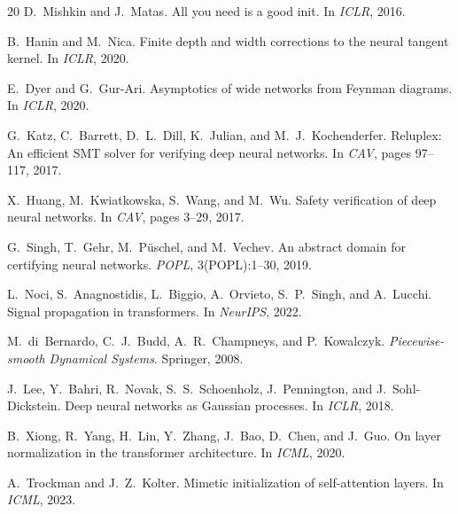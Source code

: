 \documentclass[10pt]{article}
\begin{document}
\begin{thebibliography}{20}
D.~Mishkin and J.~Matas.
\newblock All you need is a good init.
\newblock In \emph{ICLR}, 2016.

B.~Hanin and M.~Nica.
\newblock Finite depth and width corrections to the neural tangent kernel.
\newblock In \emph{ICLR}, 2020.

E.~Dyer and G.~Gur-Ari.
\newblock Asymptotics of wide networks from {F}eynman diagrams.
\newblock In \emph{ICLR}, 2020.

G.~Katz, C.~Barrett, D.~L.~Dill, K.~Julian, and M.~J.~Kochenderfer.
\newblock Reluplex: An efficient {SMT} solver for verifying deep neural networks.
\newblock In \emph{CAV}, pages 97--117, 2017.

X.~Huang, M.~Kwiatkowska, S.~Wang, and M.~Wu.
\newblock Safety verification of deep neural networks.
\newblock In \emph{CAV}, pages 3--29, 2017.

G.~Singh, T.~Gehr, M.~P{\"u}schel, and M.~Vechev.
\newblock An abstract domain for certifying neural networks.
\newblock \emph{POPL}, 3(POPL):1--30, 2019.

L.~Noci, S.~Anagnostidis, L.~Biggio, A.~Orvieto, S.~P.~Singh, and A.~Lucchi.
\newblock Signal propagation in transformers.
\newblock In \emph{NeurIPS}, 2022.

M.~di~Bernardo, C.~J.~Budd, A.~R.~Champneys, and P.~Kowalczyk.
\newblock \emph{Piecewise-smooth Dynamical Systems}.
\newblock Springer, 2008.

J.~Lee, Y.~Bahri, R.~Novak, S.~S.~Schoenholz, J.~Pennington, and J.~Sohl-Dickstein.
\newblock Deep neural networks as {G}aussian processes.
\newblock In \emph{ICLR}, 2018.

B.~Xiong, R.~Yang, H.~Lin, Y.~Zhang, J.~Bao, D.~Chen, and J.~Guo.
\newblock On layer normalization in the transformer architecture.
\newblock In \emph{ICML}, 2020.

A.~Trockman and J.~Z.~Kolter.
\newblock Mimetic initialization of self-attention layers.
\newblock In \emph{ICML}, 2023.

\end{thebibliography}

\clearpage
\appendix
\end{document}
